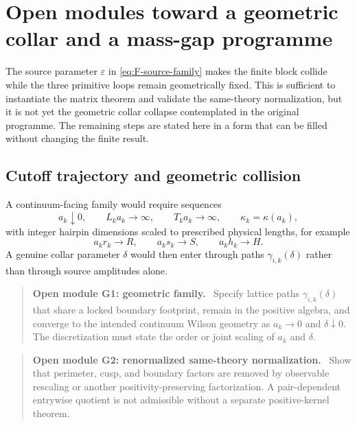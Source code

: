 \documentclass[11pt]{article}
\newcommand{\eps}{\varepsilon}
\newenvironment{openmodule}[1]
{\begin{quote}\color{red!55!black}\textbf{Open module #1.}\ }
{\end{quote}}
\begin{document}
\section{Open modules toward a geometric collar and a mass-gap programme}
\label{sec:open-modules}

The source parameter $\eps$ in \eqref{eq:F-source-family} makes the finite block collide while the three primitive loops remain geometrically fixed.  This is sufficient to instantiate the matrix theorem and validate the same-theory normalization, but it is not yet the geometric collar collapse contemplated in the original programme.  The remaining steps are stated here in a form that can be filled without changing the finite result.

\subsection{Cutoff trajectory and geometric collision}

A continuum-facing family would require sequences
\begin{equation}
  a_k\downarrow0,
  \qquad
  L_ka_k\longrightarrow\infty,
  \qquad
  T_ka_k\longrightarrow\infty,
  \qquad
  \kappa_k=\kappa(a_k),
  \label{eq:cutoff-trajectory}
\end{equation}
with integer hairpin dimensions scaled to prescribed physical lengths, for example
\begin{equation}
  a_kr_k\to R,
  \qquad
  a_ks_k\to S,
  \qquad
  a_kh_k\to H.
  \label{eq:physical-loop-scaling}
\end{equation}
A genuine collar parameter $\delta$ would then enter through paths $\gamma_{i,k}(\delta)$ rather than through source amplitudes alone.

\begin{openmodule}{G1: geometric family}
Specify lattice paths $\gamma_{i,k}(\delta)$ that share a locked boundary footprint, remain in the positive algebra, and converge to the intended continuum Wilson geometry as $a_k\to0$ and $\delta\downarrow0$.  The discretization must state the order or joint scaling of $a_k$ and $\delta$.
\end{openmodule}

\begin{openmodule}{G2: renormalized same-theory normalization}
Show that perimeter, cusp, and boundary factors are removed by observable rescaling or another positivity-preserving factorization.  A pair-dependent entrywise quotient is not admissible without a separate positive-kernel theorem.
\end{openmodule}
\end{document}
